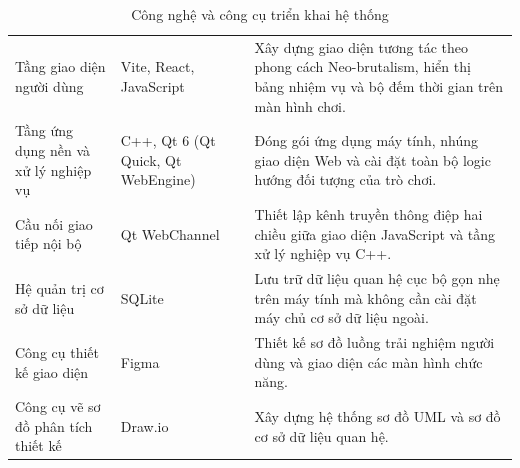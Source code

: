 \begin{table}[h!]
\centering
\caption{Công nghệ và công cụ triển khai hệ thống}
\label{tab:tech_stack}
\begin{tabularx}{\textwidth}{|L{3.2cm}|L{4.2cm}|Y|}
\hline
{} &  &  \\ \hline
Tầng giao diện người dùng & Vite, React, JavaScript & Xây dựng giao diện tương tác theo phong cách Neo-brutalism, hiển thị bảng nhiệm vụ và bộ đếm thời gian trên màn hình chơi. \\ \hline
Tầng ứng dụng nền và xử lý nghiệp vụ & C++, Qt 6 (Qt Quick, Qt WebEngine) & Đóng gói ứng dụng máy tính, nhúng giao diện Web và cài đặt toàn bộ logic hướng đối tượng của trò chơi. \\ \hline
Cầu nối giao tiếp nội bộ & Qt WebChannel & Thiết lập kênh truyền thông điệp hai chiều giữa giao diện JavaScript và tầng xử lý nghiệp vụ C++. \\ \hline
Hệ quản trị cơ sở dữ liệu & SQLite & Lưu trữ dữ liệu quan hệ cục bộ gọn nhẹ trên máy tính mà không cần cài đặt máy chủ cơ sở dữ liệu ngoài. \\ \hline
Công cụ thiết kế giao diện & Figma & Thiết kế sơ đồ luồng trải nghiệm người dùng và giao diện các màn hình chức năng. \\ \hline
Công cụ vẽ sơ đồ phân tích thiết kế & Draw.io & Xây dựng hệ thống sơ đồ UML và sơ đồ cơ sở dữ liệu quan hệ. \\ \hline
\end{tabularx}
\end{table}

